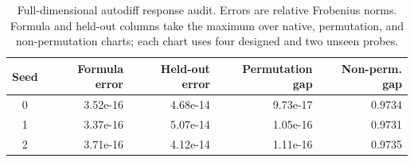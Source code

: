 \begin{table}[H]
\centering\small
\caption{Full-dimensional autodiff response audit. Errors are relative Frobenius norms. Formula and held-out columns take the maximum over native, permutation, and non-permutation charts; each chart uses four designed and two unseen probes.}
\label{tab:autograd-tomography}
\begin{tabular}{@{}crrrr@{}}
\toprule
Seed & Formula error & Held-out error & Permutation gap & Non-perm. gap \\
\midrule
0 & 3.52e-16 & 4.68e-14 & 9.73e-17 & 0.9734 \\
1 & 3.37e-16 & 5.07e-14 & 1.05e-16 & 0.9731 \\
2 & 3.71e-16 & 4.12e-14 & 1.11e-16 & 0.9735 \\
\bottomrule
\end{tabular}
\end{table}
